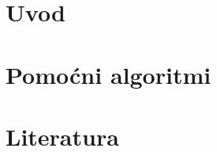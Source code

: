 \documentclass[pdftex,12pt,a4paper]{report}
\begin{document}


\tableofcontents

\chapter{Uvod}


\chapter{Pomoćni algoritmi}



\chapter{Literatura}

%

\end{document}
